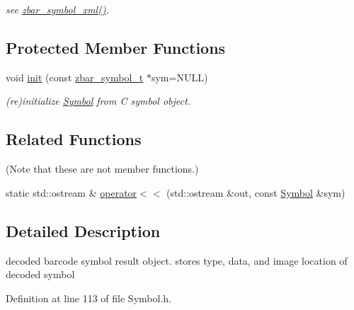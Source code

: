 \begin{DoxyCompactItemize}
\begin{DoxyCompactList}\small\item\em see \hyperlink{zbar_8h_a22ab5322eed81d018eab813e27f5ab8c}{zbar\_\-symbol\_\-xml()}. \end{DoxyCompactList}\end{DoxyCompactItemize}
\subsection*{Protected Member Functions}
\begin{DoxyCompactItemize}
\item 
\hypertarget{classzbar_1_1_symbol_a914fc886337e14002171dd3e89aa0c5a}{
void \hyperlink{classzbar_1_1_symbol_a914fc886337e14002171dd3e89aa0c5a}{init} (const \hyperlink{zbar_8h_a55b659c1945f2984b5ec8386127e5c43}{zbar\_\-symbol\_\-t} $\ast$sym=NULL)}
\label{classzbar_1_1_symbol_a914fc886337e14002171dd3e89aa0c5a}

\begin{DoxyCompactList}\small\item\em (re)initialize \hyperlink{classzbar_1_1_symbol}{Symbol} from C symbol object. \end{DoxyCompactList}\end{DoxyCompactItemize}
\subsection*{Related Functions}
(Note that these are not member functions.) \begin{DoxyCompactItemize}
\item 
static std::ostream \& \hyperlink{classzbar_1_1_symbol_a26d9e1f03e35d7a592c15fd31829972b}{operator$<$$<$} (std::ostream \&out, const \hyperlink{classzbar_1_1_symbol}{Symbol} \&sym)
\end{DoxyCompactItemize}


\subsection{Detailed Description}
decoded barcode symbol result object. stores type, data, and image location of decoded symbol 

Definition at line 113 of file Symbol.h.



